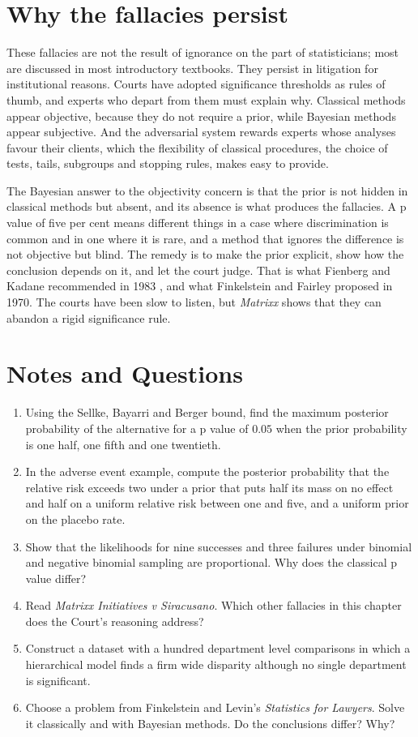 \section{Why the fallacies persist}

These fallacies are not the result of ignorance on the part of statisticians; most are discussed in most introductory textbooks. They persist in litigation for institutional reasons. Courts have adopted significance thresholds as rules of thumb, and experts who depart from them must explain why. Classical methods appear objective, because they do not require a prior, while Bayesian methods appear subjective. And the adversarial system rewards experts whose analyses favour their clients, which the flexibility of classical procedures, the choice of tests, tails, subgroups and stopping rules, makes easy to provide.

The Bayesian answer to the objectivity concern is that the prior is not hidden in classical methods but absent, and its absence is what produces the fallacies. A p value of five per cent means different things in a case where discrimination is common and in one where it is rare, and a method that ignores the difference is not objective but blind. The remedy is to make the prior explicit, show how the conclusion depends on it, and let the court judge. That is what Fienberg and Kadane recommended in 1983 \citep{fienberg_kadane1983}, and what Finkelstein and Fairley proposed in 1970. The courts have been slow to listen, but \emph{Matrixx} shows that they can abandon a rigid significance rule.

\section*{Notes and Questions}
\begin{enumerate}[label=\arabic*.]
\item Using the Sellke, Bayarri and Berger bound, find the maximum posterior probability of the alternative for a p value of $0.05$ when the prior probability is one half, one fifth and one twentieth.
\item In the adverse event example, compute the posterior probability that the relative risk exceeds two under a prior that puts half its mass on no effect and half on a uniform relative risk between one and five, and a uniform prior on the placebo rate.
\item Show that the likelihoods for nine successes and three failures under binomial and negative binomial sampling are proportional. Why does the classical p value differ?
\item Read \emph{Matrixx Initiatives v Siracusano}. Which other fallacies in this chapter does the Court's reasoning address?
\item Construct a dataset with a hundred department level comparisons in which a hierarchical model finds a firm wide disparity although no single department is significant.
\item Choose a problem from Finkelstein and Levin's \emph{Statistics for Lawyers}. Solve it classically and with Bayesian methods. Do the conclusions differ? Why?
\end{enumerate}

